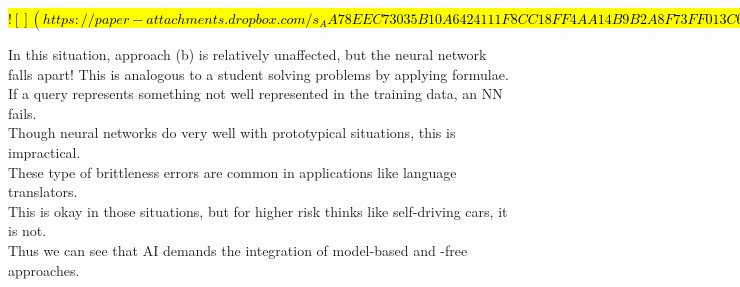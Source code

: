 \documentclass[../../lecture_notes.tex]{subfiles}
\begin{document}
\hl{
$![](https://paper-attachments.dropbox.com/s_AA78EEC73035B10A6424111F8CC18FF4AA14B9B2A8F73FF013C6765837E92F61_1591304763546_Untitled+drawing+4.jpg)$
}

\noindent In this situation, approach (b) is relatively unaffected, but the neural network falls apart!
This is analogous to a student solving problems by applying formulae.\\
If a query represents something not well represented in the training data, an NN fails.\\
Though neural networks do very well with prototypical situations, this is impractical.\\
	\indent These type of brittleness errors are common in applications like language translators.\\
	\indent This is okay in those situations, but for higher risk thinks like self-driving cars, it is not.\\
Thus we can see that AI demands the integration of model-based and -free approaches.
\end{document}
